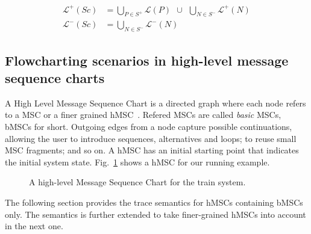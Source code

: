 \vspace{-0.5cm}
\begin{align*}
\mathcal{L}^+(Sc) &= \bigcup_{P \in S^+} \mathcal{L}(P)~~\cup~~\bigcup_{N \in S^{-}} \mathcal{L}^{+}(N) \\
\mathcal{L}^-(Sc) &= \bigcup_{N \in S^-} \mathcal{L}^{-}(N)
\end{align*}

\subsection{Flowcharting scenarios in high-level message sequence charts\label{subsection:background-hmsc}}

A High Level Message Sequence Chart is a directed graph where each node refers to a MSC or a finer grained hMSC~\cite{ITU:1996}. Refered MSCs are called \emph{basic} MSCs, bMSCs for short. Outgoing edges from a node capture possible continuations, allowing the user to introduce sequences, alternatives and loops; to reuse small MSC fragments; and so on. A hMSC has an initial starting point that indicates the initial system state. Fig.~\ref{image:train-hmsc} shows a hMSC for our running example.

\vspace{0.4cm}
\begin{figure}[H]\centering
{}
\caption{A high-level Message Sequence Chart for the train system.\label{image:train-hmsc}}
\end{figure}

The following section provides the trace semantics for hMSCs containing bMSCs only. The semantics is further extended to take finer-grained hMSCs into account in the next one. 

